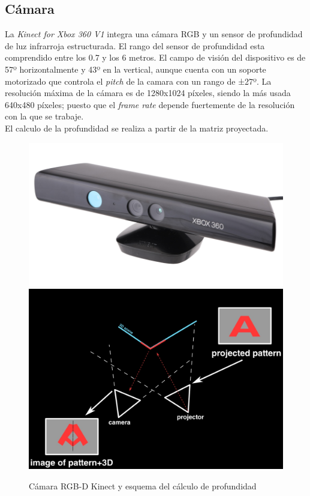 \subsection{Cámara}
La \textit{Kinect for Xbox 360 V1} integra una cámara RGB y un sensor de profundidad de luz infrarroja estructurada. El rango del sensor de profundidad esta comprendido entre los 0.7 y los 6 metros. El campo de visión del
dispositivo es de 57º horizontalmente y 43º en la vertical, aunque cuenta con un soporte motorizado que controla el \textit{pitch} de la camara con un rango de ±27º. La resolución máxima de la cámara es de 1280x1024 píxeles,
siendo la más usada 640x480 píxeles; puesto que el \textit{frame rate} depende fuertemente de la resolución con la que se trabaje. \\
El calculo de la profundidad se realiza a partir de la matriz proyectada.
\begin{figure}[h!]
	\centering
	\includegraphics[width=.4\textwidth]{images/kinect}
	\includegraphics[width=.5\textwidth]{images/kinect_teo}
	\caption{Cámara RGB-D Kinect y esquema del cálculo de profundidad}
\end{figure}

\newpage
